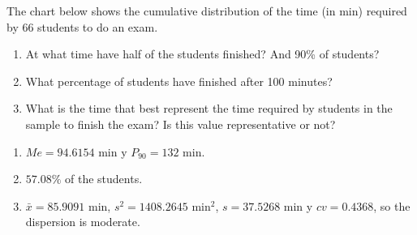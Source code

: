 {The chart below shows the cumulative distribution of the time (in min) required by 66 students to do an exam.

\begin{center}
\resizebox{0.7\textwidth}{!}{}
\end{center}

\begin{enumerate}
\item At what time have half of the students finished? And 90\% of students?
\item What percentage of students have finished after 100 minutes?
\item What is the time that best represent the time required by students in the sample to finish the exam? Is this
value representative or not?
\end{enumerate}
}
{\begin{enumerate}
\item $Me = 94.6154$ min y $P_{90}=132$ min.
\item $57.08\%$ of the students.
\item $\bar x= 85.9091$ min, $s^2 =1408.2645$ min$^2$, $s= 37.5268$ min y $cv= 0.4368$, so the dispersion is moderate.
\end{enumerate}
}
